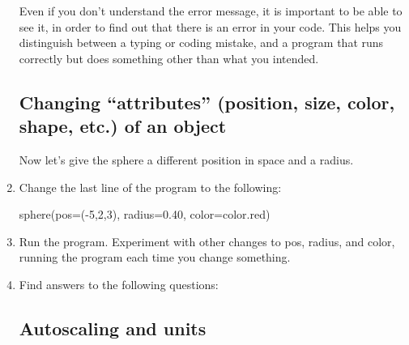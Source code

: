 \begin{enumerate}
Even if you don't understand the error message, it is important to be able to see it, in order to find out that there is an error in your code. This helps you distinguish between a typing or coding mistake, and a program that runs correctly but does something other than what you intended.
	
	\subsection*{Changing ``attributes'' (position, size, color, shape, etc.) of an object}
	
Now let's give the sphere a different position in space and a radius. 

	\item Change the last line of the program to the following:
	
sphere(pos=(-5,2,3), radius=0.40, color=color.red)

	\item Run the program.  Experiment with other changes to pos, radius, and color, running the program each time you change something.
	\item Find answers to the following questions:
	

	\subsection*{Autoscaling and units}


\end{enumerate}

